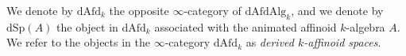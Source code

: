 \documentclass[oneside, hidelinks, 12pt, a4paper,reqno]{amsart}
\theoremstyle{plain}
\theoremstyle{definition}
\theoremstyle{plain}
\newtheorem{lemma}[lemma]{Lemma}
\newcommand{\cD}{\mathscr D}
\newcommand{\dSp}{\mathrm{dSp}}
\newcommand{\cat}{$\infty$-category }
\newcommand{\Solid}{\blacksquare}
\begin{document}

We denote by $\mathrm{dAfd}_k$ the opposite \cat of $\mathrm{dAfdAlg}_k$, and we denote by $\dSp(A)$ the object in $\mathrm{dAfd}_k$ associated with the animated affinoid $k$-algebra $A$. We refer to the objects in the \cat $\mathrm{dAfd}_k$ as \emph{derived $k$-affinoid spaces}.
\end{document}
